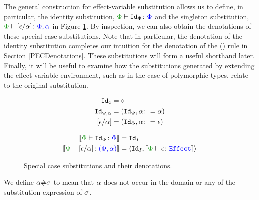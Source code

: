 \documentclass{Report}
\begin{document}
The general construction for effect-variable substitution allows us to define, in particular, the identity substitution, $\typerelation{\P}{\Id{\P}}{\P}$ and the singleton substitution, $\typerelation{\P}{\ssub{\a}{\e}}{\P,\a}$ in Figure \ref{EffectSpecialSubs}. By inspection, we can also obtain the denotations of these special-case substitutions. Note that in particular, the denotation of the identity substitution completes our intuition for the denotation of the (\textit{\vspec}) rule in Section \ref{PECDenotations}. These substitutions will form a useful shorthand later. Finally, it will be useful to examine how the substitutions generated by extending the effect-variable environment, such as in the case of polymorphic types, relate to the original substitution.

\begin{figure}[H]
    \centering
    \begin{minipage}{.45\linewidth}
        \begin{framed}
            \begin{align*}
                \Id{\nil} & = \nil\\
                \Id{\P,\a} & = (\Id{\P}, \a\setto\a)\\
                \ssub{\a}{\e} & = (\Id{\P}, \a\setto \e)
            \end{align*}
        \end{framed}
    \end{minipage}
    \quad
    \begin{minipage}{.45\linewidth}
        \begin{framed}
            \begin{align*}
                \deno{\typerelation{\P}{\Id{\P}}{\P}} & = \Id{I}\\
                \deno{\typerelation{\P}{\ssub{\a}{\e}}{(\P,\a)}} & = \pr{\Id{I}}{\deno{\typerelation{\P}{\e}{\effect}}}
                \\
            \end{align*}
        \end{framed}
    \end{minipage}
    \caption{Special case substitutions and their denotations.}
    \label{EffectSpecialSubs}
\end{figure}

\begin{framed}
    \begin{definition}[Freshness]\label{EffectFreshness}
      We define $\alpha \# \sigma$ to mean that $\alpha$ does not occur in the domain or any of the substitution expression of $\sigma$.
    \end{definition}
\end{framed}
\end{document}
